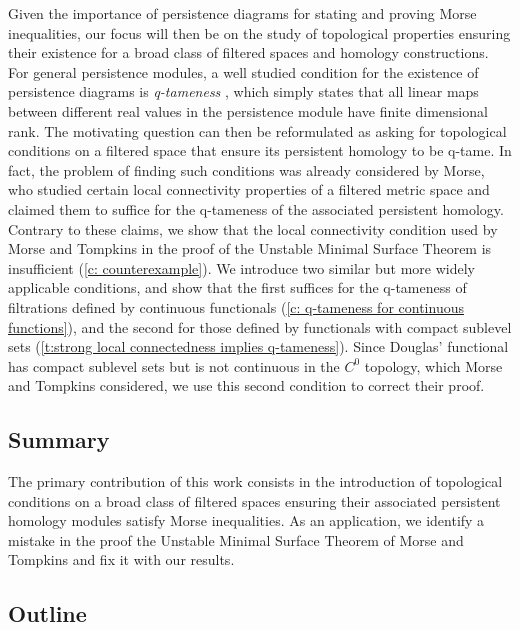 Given the importance of persistence diagrams for stating and proving Morse inequalities, our focus will then be on the study of topological properties ensuring their existence for a broad class of filtered spaces and homology constructions.
For general persistence modules, a well studied condition for the existence of persistence diagrams is \textit{q-tameness} \cite{Chazal.2016a,Chazal.2016b}, which simply states that all linear maps between different real values in the persistence module have finite dimensional rank.
The motivating question can then be reformulated as asking for topological conditions on a filtered space that ensure its persistent homology to be q-tame.
In fact, the problem of finding such conditions was already considered by Morse, who studied certain local connectivity properties of a filtered metric space and claimed them to suffice for the q-tameness of the associated persistent homology.
Contrary to these claims, we show that the local connectivity condition used by Morse and Tompkins in the proof of the Unstable Minimal Surface Theorem is insufficient (\cref{c: counterexample}).
We introduce two similar but more widely applicable conditions, and show that the first suffices for the \mbox{q-tameness} of filtrations defined by continuous functionals (\cref{c: q-tameness for continuous functions}), and the second for those defined by functionals with compact sublevel sets (\cref{t:strong local connectedness implies q-tameness}).
Since Douglas' functional has compact sublevel sets but is not continuous in the $C^0$ topology, which Morse and Tompkins considered, we use this second condition to correct their proof.

\subsection*{Summary}

The primary contribution of this work consists in the introduction of topological conditions on a broad class of filtered spaces ensuring their associated persistent homology modules satisfy Morse inequalities.
As an application, we identify a mistake in the proof the Unstable Minimal Surface Theorem of Morse and Tompkins and fix it with our results. 

\subsection*{Outline}

